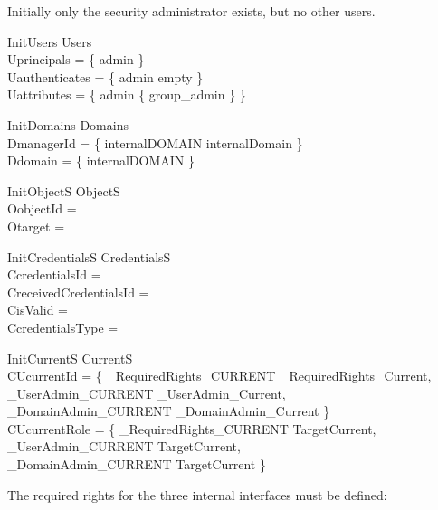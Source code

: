 Initially only the security administrator exists, but no other users.
\begin{schema}{InitUsers}
  Users \\
  \where
  Uprincipals = \{ admin \} \\
  Uauthenticates = \{ admin \mapsto empty \} \\
  Uattributes = \{ admin \mapsto \{ group\_admin \} \} \\
\end{schema}
\begin{schema}{InitDomains}
  Domains \\
  \where
  DmanagerId = \{ internalDOMAIN \mapsto internalDomain \} \\
  Ddomain = \{ internalDOMAIN \mapsto \emptyset \} \\
\end{schema}
\begin{schema}{InitObjectS}
  ObjectS \\
  \where
  OobjectId = \emptyset \\
  Otarget = \emptyset \\
\end{schema}
\begin{schema}{InitCredentialsS}
  CredentialsS \\
  \where
  CcredentialsId = \emptyset \\
  CreceivedCredentialsId = \emptyset \\
  CisValid = \emptyset \\
  CcredentialsType = \emptyset \\
\end{schema}
\begin{schema}{InitCurrentS}
  CurrentS \\
  \where
  CUcurrentId = \{ \< \_RequiredRights\_CURRENT \mapsto \_RequiredRights\_Current, \\
  \_UserAdmin\_CURRENT \mapsto \_UserAdmin\_Current, \\
  \_DomainAdmin\_CURRENT \mapsto \_DomainAdmin\_Current \} \> \\
  CUcurrentRole = \{ \< \_RequiredRights\_CURRENT \mapsto TargetCurrent, \\
  \_UserAdmin\_CURRENT \mapsto TargetCurrent, \\
  \_DomainAdmin\_CURRENT \mapsto TargetCurrent \} \>
\end{schema}
The required rights for the three internal interfaces must be defined:
